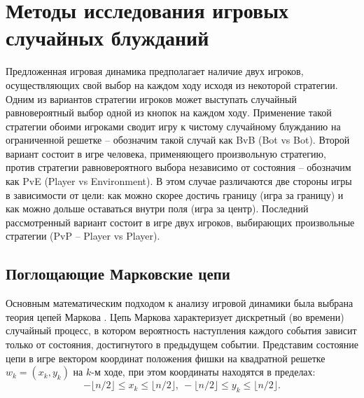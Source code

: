 \section{Методы исследования игровых случайных блужданий}\label{sec:ch3/sec2}

Предложенная игровая динамика предполагает наличие двух игроков, осуществляющих свой выбор на каждом ходу исходя из некоторой стратегии. Одним из вариантов стратегии игроков может выступать случайный равновероятный выбор одной из кнопок на каждом ходу. Применение такой стратегии обоими игроками сводит игру к чистому случайному блужданию на ограниченной решетке -- обозначим такой случай как BvB (Bot vs Bot). Второй вариант состоит в игре человека, применяющего произвольную стратегию, против стратегии равновероятного выбора независимо от состояния -- обозначим как PvE (Player vs Environment). В этом случае различаются две стороны игры в зависимости от цели: как можно скорее достичь границу (игра за границу) и как можно дольше оставаться внутри поля (игра за центр). Последний рассмотренный вариант состоит в игре двух игроков, выбирающих произвольные стратегии (PvP -- Player vs Player).


\subsection{Поглощающие Марковские цепи}\label{subsec:ch3/sec2/sub1}

Основным математическим подходом к анализу игровой динамики была выбрана теория цепей Маркова \cite{gagniuc_markov_2017}. Цепь Маркова характеризует дискретный (во времени) случайный процесс, в котором вероятность наступления каждого события зависит только от состояния, достигнутого в предыдущем событии. Представим состояние цепи в игре вектором координат положения фишки на квадратной решетке $w_k = (x_k, y_k)$ на $k$-м ходе, при этом координаты находятся в пределах:
\begin{equation}
    -\lfloor n/2 \rfloor \leq x_k \leq \lfloor n/2 \rfloor, \: -\lfloor n/2 \rfloor \leq y_k \leq \lfloor n/2 \rfloor. 
    \label{eq:all-states}    
\end{equation}

